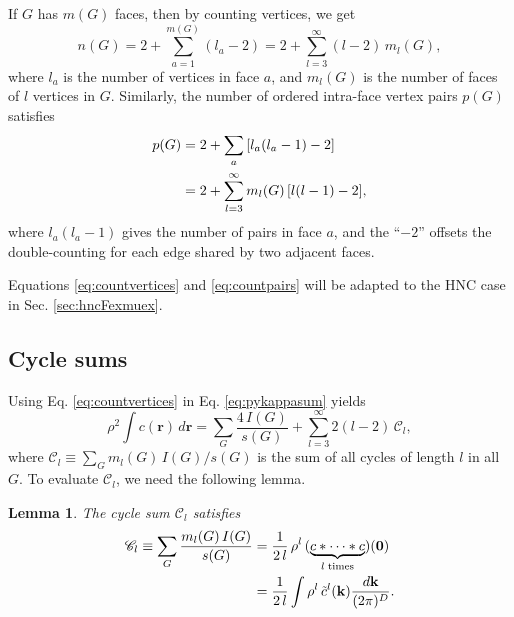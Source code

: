 \documentclass[preprint]{revtex4-1}
\newtheorem{lemm}[thrm]{Lemma}
\newcommand{\vct}[1]{\mathbf{#1}}
\providecommand{\vr}{} %
\renewcommand{\vr}{\vct{r}}
\newcommand{\vk}{\vct{k}}
\newcommand{\dvk}{\frac{d\vk}{(2\pi)^D}}
\newcommand{\Chn}{\mathscr{C}}
\begin{document}
If $G$ has $m(G)$ faces, then by counting vertices, we get
%
\begin{equation}
  n(G) = 2 + \sum_{a = 1}^{m(G)} (l_a - 2)
       = 2 + \sum_{l = 3}^\infty (l - 2) \, m_l(G),
\label{eq:countvertices}
\end{equation}
%
where
  $l_a$ is the number of vertices in face $a$,
%
and
  $m_l(G)$ is the number of faces of $l$ vertices in $G$.
%
Similarly, the number of ordered intra-face vertex pairs
  $p(G)$ satisfies
%
\begin{align}
  p(G)  &= 2 + \sum_{a} \left[ l_a (l_a - 1) - 2 \right]
                        \notag \\
        &= 2 + \sum_{l = 3}^\infty m_l(G) \, [l(l-1) - 2],
\label{eq:countpairs}
\end{align}
%
where $l_a (l_a - 1)$ gives the number of pairs in face $a$,
  and the ``$-2$'' %
  offsets the double-counting
  for each edge shared by two adjacent faces.

Equations \eqref{eq:countvertices} and \eqref{eq:countpairs}
will be adapted to the HNC case in Sec. \ref{sec:hncFexmuex}.





\subsection{Cycle sums}





Using Eq. \eqref{eq:countvertices} in Eq. \eqref{eq:pykappasum} yields
%
\begin{equation}
    \rho^2 \int c(\vr) \, d\vr
  = \sum_G \frac{ 4 \, I(G) }{ s(G) }
  + \sum_{l = 3}^\infty 2 (l - 2) \, \Chn_l,
\label{eq:pyintgcr2sums}
\end{equation}
%
where
$\Chn_l \equiv \sum_G m_l(G) \, I(G) / s(G)$
is the sum of all cycles of length $l$ in all $G$.
%
To evaluate $\Chn_l$, we need the following lemma.

\begin{lemm}
The cycle sum $\Chn_l$ satisfies
\begin{align}
      \Chn_l
  \equiv
      \sum_G \frac{ m_l(G) \, I(G) } { s(G) }
  &=  \frac{1}{2 \, l} \,
      \rho^l \, (\underbrace{c*\cdots *c}_{l \; \mathrm{times}})(\vct 0)
      \notag \\
  &=  \frac{1}{2 \, l}
      \int \rho^l \, \tilde{c}^l(\vk) \dvk.
\label{eq:ccycling}
\end{align}
%
\end{lemm}
\end{document}
